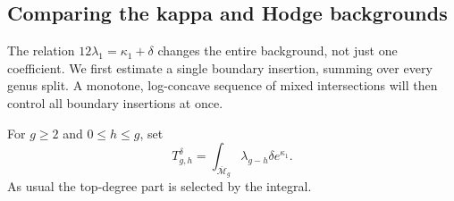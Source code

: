 \documentclass[a4paper,10pt]{article}
\numberwithin{equation}{section}
\newcommand{\MM}{\overline{\mathcal{M}}}
\theoremstyle{paperplain}
\theoremstyle{paperremark}
\theoremstyle{paperplain}
\begin{document}
\subsection{Comparing the kappa and Hodge backgrounds}
\label{subsec:s08:05}

The relation $12\lambda_1=\kappa_1+\delta$ changes the entire
background, not just one coefficient. We first estimate a single
boundary insertion, summing over every genus split. A monotone,
log-concave sequence of mixed intersections will then control all
boundary insertions at once.

For $g\geq2$ and $0\leq h\leq g$, set
\begin{equation}\label{eq:s08:node-definition}
 T_{g,h}^{\delta}
   =\int_{\MM_g}\lambda_{g-h}\delta e^{\kappa_1}.
\end{equation}
As usual the top-degree part is selected by the integral.
\end{document}
